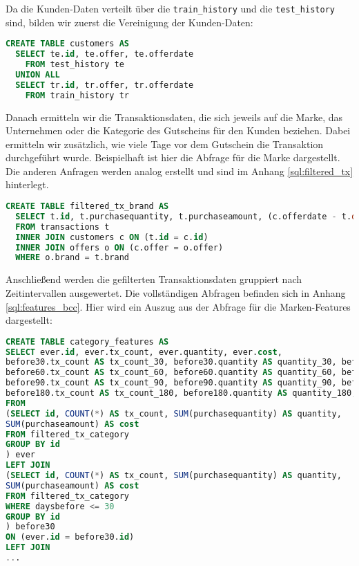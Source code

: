Da die Kunden-Daten verteilt über die \texttt{train\_history} und die \texttt{test\_history} sind, 
bilden wir zuerst die Vereinigung der Kunden-Daten:

\begin{lstlisting}[language=SQL]
CREATE TABLE customers AS 
  SELECT te.id, te.offer, te.offerdate
    FROM test_history te
  UNION ALL
  SELECT tr.id, tr.offer, tr.offerdate
    FROM train_history tr 
\end{lstlisting}

Danach ermitteln wir die Transaktionsdaten, die sich jeweils auf die Marke, das Unternehmen oder 
die Kategorie des Gutscheins für den Kunden beziehen. Dabei ermitteln wir zusätzlich, wie viele
Tage vor dem Gutschein die Transaktion durchgeführt wurde. Beispielhaft ist hier die Abfrage
für die Marke dargestellt. Die anderen Anfragen werden analog erstellt und sind im Anhang
\ref{sql:filtered_tx} hinterlegt.
\begin{lstlisting}[language=SQL]
CREATE TABLE filtered_tx_brand AS
  SELECT t.id, t.purchasequantity, t.purchaseamount, (c.offerdate - t.date) AS daysbefore 
  FROM transactions t 
  INNER JOIN customers c ON (t.id = c.id)
  INNER JOIN offers o ON (c.offer = o.offer)
  WHERE o.brand = t.brand
\end{lstlisting}

Anschließend werden die gefilterten Transaktionsdaten gruppiert nach
Zeitintervallen ausgewertet. Die vollständigen Abfragen befinden sich
in Anhang \ref{sql:features_bcc}. Hier wird ein Auszug aus der
Abfrage für die Marken-Features dargestellt:
\begin{lstlisting}[language=SQL]
CREATE TABLE category_features AS
SELECT ever.id, ever.tx_count, ever.quantity, ever.cost,
before30.tx_count AS tx_count_30, before30.quantity AS quantity_30, before30.cost AS cost_30,
before60.tx_count AS tx_count_60, before60.quantity AS quantity_60, before60.cost AS cost_60,
before90.tx_count AS tx_count_90, before90.quantity AS quantity_90, before90.cost AS cost_90,
before180.tx_count AS tx_count_180, before180.quantity AS quantity_180, before180.cost AS cost_180
FROM 
(SELECT id, COUNT(*) AS tx_count, SUM(purchasequantity) AS quantity, 
SUM(purchaseamount) AS cost
FROM filtered_tx_category
GROUP BY id
) ever
LEFT JOIN
(SELECT id, COUNT(*) AS tx_count, SUM(purchasequantity) AS quantity, 
SUM(purchaseamount) AS cost
FROM filtered_tx_category
WHERE daysbefore <= 30
GROUP BY id
) before30
ON (ever.id = before30.id)
LEFT JOIN
...
\end{lstlisting}

